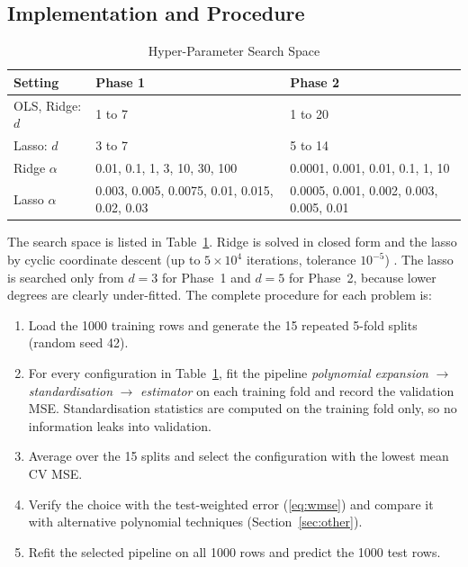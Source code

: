 \documentclass[conference]{IEEEtran}
\begin{document}
\subsection{Implementation and Procedure}
\begin{table}[!t]
\renewcommand{\arraystretch}{1.12}
\caption{Hyper-Parameter Search Space}
\label{tab:grid}
\centering\footnotesize
\setlength{\tabcolsep}{4pt}
\begin{tabular}{@{}lll@{}}
\toprule
Setting & Phase 1 & Phase 2 \\
\midrule
OLS, Ridge: $d$ & 1 to 7 & 1 to 20 \\
Lasso: $d$ & 3 to 7 & 5 to 14 \\
Ridge $\alpha$ & \parbox[t]{2.2cm}{\raggedright 0.01, 0.1, 1, 3, 10, 30, 100} & \parbox[t]{2.2cm}{\raggedright 0.0001, 0.001, 0.01, 0.1, 1, 10} \\
Lasso $\alpha$ & \parbox[t]{2.2cm}{\raggedright 0.003, 0.005, 0.0075, 0.01, 0.015, 0.02, 0.03} & \parbox[t]{2.2cm}{\raggedright 0.0005, 0.001, 0.002, 0.003, 0.005, 0.01} \\
\bottomrule
\end{tabular}
\end{table}
The search space is listed in Table~\ref{tab:grid}. Ridge is solved in closed form and the lasso by cyclic coordinate descent (up to $5\times10^4$ iterations, tolerance $10^{-5}$) \cite{pedregosa2011}. The lasso is searched only from $d=3$ for Phase~1 and $d=5$ for Phase~2, because lower degrees are clearly under-fitted. The complete procedure for each problem is:
\begin{enumerate}
\item Load the 1000 training rows and generate the 15 repeated 5-fold splits (random seed 42).
\item For every configuration in Table~\ref{tab:grid}, fit the pipeline \emph{polynomial expansion} $\rightarrow$ \emph{standardisation} $\rightarrow$ \emph{estimator} on each training fold and record the validation MSE. Standardisation statistics are computed on the training fold only, so no information leaks into validation.
\item Average over the 15 splits and select the configuration with the lowest mean CV MSE.
\item Verify the choice with the test-weighted error (\ref{eq:wmse}) and compare it with alternative polynomial techniques (Section~\ref{sec:other}).
\item Refit the selected pipeline on all 1000 rows and predict the 1000 test rows.
\end{enumerate}
\end{document}
